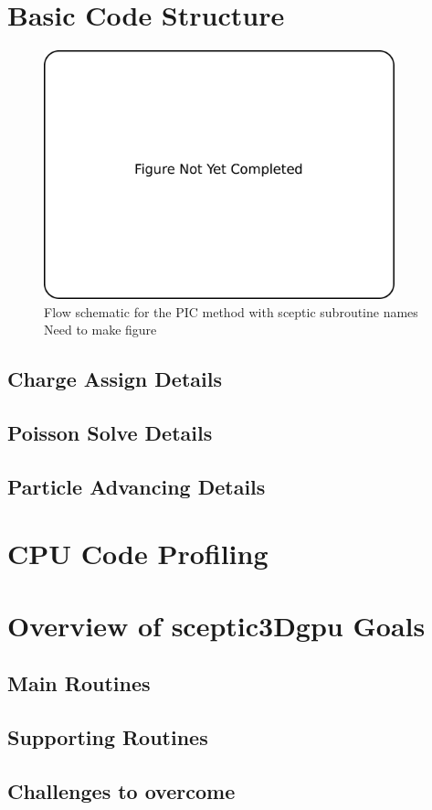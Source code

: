 		\section{Basic Code Structure}
\begin{figure}
\begin{center}
\includegraphics[width=4in]{introduction/not_finished.pdf}
\end{center}
\caption{Flow schematic for the PIC method with sceptic subroutine names Need to make figure}
\label{fig:pic_flowchart_sceptic}
\end{figure}
		
		\subsection{Charge Assign Details}
		
		\subsection{Poisson Solve Details}
		
		\subsection{Particle Advancing Details}
		

		\section{CPU Code Profiling}

	\section{Overview of sceptic3Dgpu Goals}

		\subsection{Main Routines}

		\subsection{Supporting Routines}

		\subsection{Challenges to overcome}















